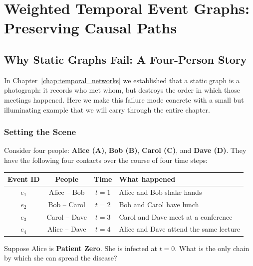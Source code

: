 \chapter{Weighted Temporal Event Graphs: Preserving Causal Paths}
\label{chap:saramaki}

\section{Why Static Graphs Fail: A Four-Person Story}
\label{sec:saramaki_motivation}

In Chapter~\ref{chap:temporal_networks} we established that a static graph is a
photograph: it records who met whom, but destroys the order in which those
meetings happened. Here we make this failure mode concrete with a small but
illuminating example that we will carry through the entire chapter.

\subsection{Setting the Scene}

Consider four people: \textbf{Alice (A)}, \textbf{Bob (B)}, \textbf{Carol (C)},
and \textbf{Dave (D)}. They have the following four contacts over the course of
four time steps:

\begin{center}
\begin{tabular}{cccl}
\toprule
\textbf{Event ID} & \textbf{People} & \textbf{Time} & \textbf{What happened} \\
\midrule
$e_1$ & Alice -- Bob   & $t = 1$ & Alice and Bob shake hands \\
$e_2$ & Bob -- Carol   & $t = 2$ & Bob and Carol have lunch \\
$e_3$ & Carol -- Dave  & $t = 3$ & Carol and Dave meet at a conference \\
$e_4$ & Alice -- Dave  & $t = 4$ & Alice and Dave attend the same lecture \\
\bottomrule
\end{tabular}
\end{center}

Suppose Alice is \textbf{Patient Zero}. She is infected at $t=0$. What is the
only chain by which she can spread the disease?

